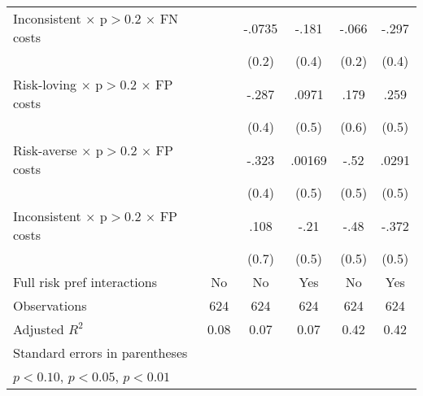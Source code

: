 \begin{tabular}{l*{5}{c}}
Inconsistent $\times$ p$>$0.2 $\times$ FN costs&                  &   -.0735         &    -.181         &    -.066         &    -.297         \\
                &                  &    (0.2)         &    (0.4)         &    (0.2)         &    (0.4)         \\
Risk-loving $\times$ p$>$0.2 $\times$ FP costs&                  &    -.287         &    .0971         &     .179         &     .259         \\
                &                  &    (0.4)         &    (0.5)         &    (0.6)         &    (0.5)         \\
Risk-averse $\times$ p$>$0.2 $\times$ FP costs&                  &    -.323         &   .00169         &     -.52         &    .0291         \\
                &                  &    (0.4)         &    (0.5)         &    (0.5)         &    (0.5)         \\
Inconsistent $\times$ p$>$0.2 $\times$ FP costs&                  &     .108         &     -.21         &     -.48         &    -.372         \\
                &                  &    (0.7)         &    (0.5)         &    (0.5)         &    (0.5)         \\
Full risk pref interactions&       No         &       No         &      Yes         &       No         &      Yes         \\
\hline
Observations    &      624         &      624         &      624         &      624         &      624         \\
Adjusted \(R^{2}\)&     0.08         &     0.07         &     0.07         &     0.42         &     0.42         \\
\hline\hline
\multicolumn{6}{l}{\footnotesize Standard errors in parentheses}\\
\multicolumn{6}{l}{\footnotesize \sym{*} \(p<0.10\), \sym{**} \(p<0.05\), \sym{***} \(p<0.01\)}\\
\end{tabular}
